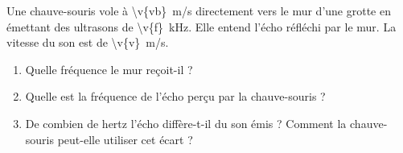 Une chauve-souris vole à \qty{\v{vb}}{m/s} directement vers le mur d'une grotte en émettant des ultrasons de \qty{\v{f}}{kHz}. Elle entend l'écho réfléchi par le mur. La vitesse du son est de \qty{\v{v}}{m/s}.

\begin{enumerate}[label=\alph*)]
    \item Quelle fréquence le mur reçoit-il ?
    \item Quelle est la fréquence de l'écho perçu par la chauve-souris ?
    \item De combien de hertz l'écho diffère-t-il du son émis ? Comment la chauve-souris peut-elle utiliser cet écart ?
\end{enumerate}
